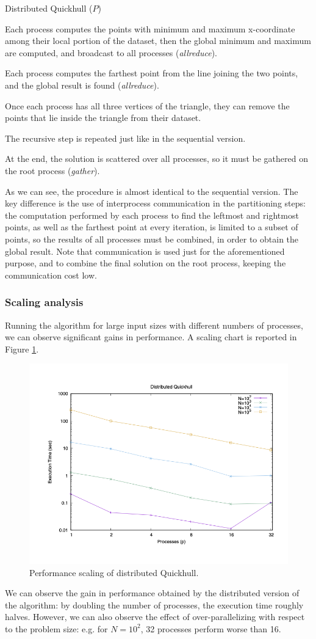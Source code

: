 \documentclass[]{finalproject}
\begin{document}
\begin{algorithm}
  \caption{Distributed Quickhull ($P$)}
  \label{alg:qh3}
  Each process computes the points with minimum and maximum x-coordinate among their local portion of the dataset, then the global minimum and maximum are computed, and broadcast to all processes (\textit{allreduce}).

  Each process computes the farthest point from the line joining the two points, and the global result is found (\textit{allreduce}).

  Once each process has all three vertices of the triangle, they can remove the points that lie inside the triangle from their dataset.

  The recursive step is repeated just like in the sequential version.

  At the end, the solution is scattered over all processes, so it must be gathered on the root process (\textit{gather}).
\end{algorithm}

As we can see, the procedure is almost identical to the sequential version.
The key difference is the use of interprocess communication in the partitioning steps:
the computation performed by each process to find the leftmost and rightmost points, as well as the farthest point at every iteration,
is limited to a subset of points, so the results of all processes must be combined, in order to obtain the global result.
Note that communication is used just for the aforementioned purpose, and to combine the final solution on the root process,
keeping the communication cost low.

\subsubsection{Scaling analysis}
Running the algorithm for large input sizes with different numbers of processes, we can observe significant gains in performance.
A scaling chart is reported in Figure \ref{fig:qh-scaling}.
\begin{figure}[H]
\centering
\includegraphics[width=0.5\linewidth]{gpStrongTime.png}
\caption{Performance scaling of distributed Quickhull.}
\label{fig:qh-scaling}
\end{figure}

We can observe the gain in performance obtained by the distributed version of the algorithm:
by doubling the number of processes, the execution time roughly halves.
However, we can also observe the effect of over-parallelizing with respect to the problem size:
e.g. for $N=10^2$, 32 processes perform worse than 16.

\clearpage


\end{document}
